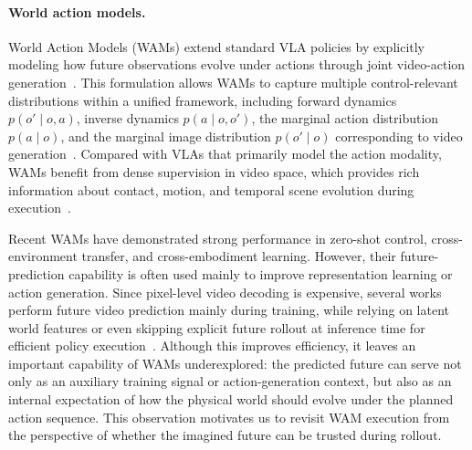 \documentclass{article}
\begin{document}
\paragraph{World action models.}
\label{sec:world action models}
World Action Models (WAMs) extend standard VLA policies by explicitly modeling how future observations evolve under actions through joint video-action generation~\citep{zhu2025unified,li2025unified, bi2025motus, ye2026world, li2026causal, yuan2026fast}. This formulation allows WAMs to capture multiple control-relevant distributions within a unified framework, including forward dynamics $p(o' \mid o, a)$, inverse dynamics $p(a \mid o, o')$, the marginal action distribution $p(a \mid o)$, and the marginal image distribution $p(o' \mid o)$ corresponding to video generation~\citep{zhu2025unified, bi2025motus, li2025unified}. Compared with VLAs that primarily model the action modality, WAMs benefit from dense supervision in video space, which provides rich information about contact, motion, and temporal scene evolution during execution~\citep{liu2026arflow, podell2023sdxl, tian2025pdfactor}.

Recent WAMs have demonstrated strong performance in zero-shot control, cross-environment transfer, and cross-embodiment learning. However, their future-prediction capability is often used mainly to improve representation learning or action generation. Since pixel-level video decoding is expensive, several works perform future video prediction mainly during training, while relying on latent world features or even skipping explicit future rollout at inference time for efficient policy
execution~\citep{yuan2026fast, ye2026gigaworld}. Although this improves efficiency, it leaves an important capability of WAMs underexplored: the predicted future can serve not only as an auxiliary training signal or action-generation context, but also as an internal expectation of how the physical world should evolve under the planned action sequence. This observation motivates us to revisit WAM execution from the perspective of whether the imagined future can be trusted during rollout.
\end{document}

